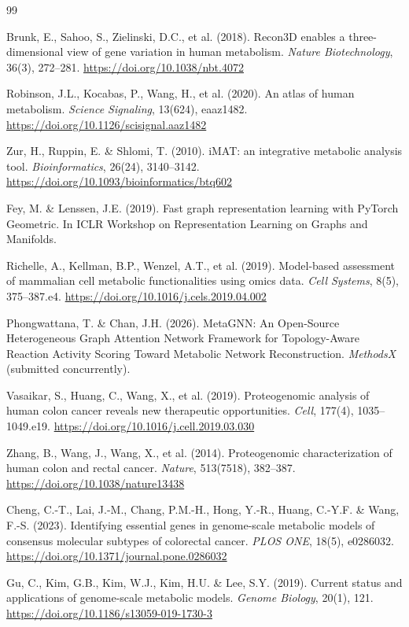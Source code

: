 \documentclass[12pt,a4paper]{article}
\begin{document}
\begin{thebibliography}{99}

 Brunk, E., Sahoo, S., Zielinski, D.C., et al. (2018). Recon3D enables a three-dimensional view of gene variation in human metabolism. \textit{Nature Biotechnology}, 36(3), 272--281. \url{https://doi.org/10.1038/nbt.4072}

 Robinson, J.L., Kocabas, P., Wang, H., et al. (2020). An atlas of human metabolism. \textit{Science Signaling}, 13(624), eaaz1482. \url{https://doi.org/10.1126/scisignal.aaz1482}

 Zur, H., Ruppin, E. \& Shlomi, T. (2010). iMAT: an integrative metabolic analysis tool. \textit{Bioinformatics}, 26(24), 3140--3142. \url{https://doi.org/10.1093/bioinformatics/btq602}

 Fey, M. \& Lenssen, J.E. (2019). Fast graph representation learning with PyTorch Geometric. In ICLR Workshop on Representation Learning on Graphs and Manifolds.

 Richelle, A., Kellman, B.P., Wenzel, A.T., et al. (2019). Model-based assessment of mammalian cell metabolic functionalities using omics data. \textit{Cell Systems}, 8(5), 375--387.e4. \url{https://doi.org/10.1016/j.cels.2019.04.002}

 Phongwattana, T. \& Chan, J.H. (2026). MetaGNN: An Open-Source Heterogeneous Graph Attention Network Framework for Topology-Aware Reaction Activity Scoring Toward Metabolic Network Reconstruction. \textit{MethodsX} (submitted concurrently).

 Vasaikar, S., Huang, C., Wang, X., et al. (2019). Proteogenomic analysis of human colon cancer reveals new therapeutic opportunities. \textit{Cell}, 177(4), 1035--1049.e19. \url{https://doi.org/10.1016/j.cell.2019.03.030}

 Zhang, B., Wang, J., Wang, X., et al. (2014). Proteogenomic characterization of human colon and rectal cancer. \textit{Nature}, 513(7518), 382--387. \url{https://doi.org/10.1038/nature13438}

 Cheng, C.-T., Lai, J.-M., Chang, P.M.-H., Hong, Y.-R., Huang, C.-Y.F. \& Wang, F.-S. (2023). Identifying essential genes in genome-scale metabolic models of consensus molecular subtypes of colorectal cancer. \textit{PLOS ONE}, 18(5), e0286032. \url{https://doi.org/10.1371/journal.pone.0286032}

 Gu, C., Kim, G.B., Kim, W.J., Kim, H.U. \& Lee, S.Y. (2019). Current status and applications of genome-scale metabolic models. \textit{Genome Biology}, 20(1), 121. \url{https://doi.org/10.1186/s13059-019-1730-3}


\end{thebibliography}
\end{document}
